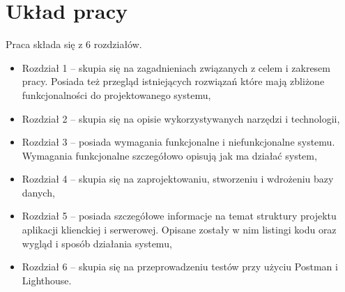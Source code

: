 \section{Układ pracy}
Praca składa się z 6 rozdziałów.
\begin {itemize}
	\item Rozdział 1 -- skupia się na zagadnieniach związanych z celem i zakresem pracy. Posiada też przegląd istniejących rozwiązań które mają zbliżone funkcjonalności do projektowanego systemu,
	\item Rozdział 2 -- skupia się na opisie wykorzystywanych narzędzi i technologii,
	\item Rozdział 3 -- posiada wymagania funkcjonalne i niefunkcjonalne systemu. Wymagania funkcjonalne szczegółowo opisują jak ma działać system,
	\item Rozdział 4 -- skupia się na zaprojektowaniu, stworzeniu i wdrożeniu bazy danych,
	\item Rozdział 5 -- posiada szczegółowe informacje na temat struktury projektu aplikacji klienckiej i serwerowej. Opisane zostały w nim listingi kodu oraz wygląd i sposób działania systemu,
	\item Rozdział 6 -- skupia się na przeprowadzeniu testów przy użyciu Postman i Lighthouse.
\end{itemize}


